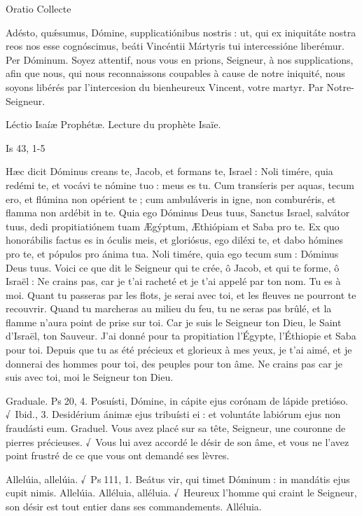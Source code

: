 \begin{paracol}{2}
Oratio
\switchcolumn
Collecte
\switchcolumn*

Adésto, quǽsumus, Dómine,  supplicatiónibus nostris : ut, qui ex iniquitáte nostra reos nos esse cognóscimus, beáti Vincéntii Mártyris tui intercessióne liberémur. Per Dóminum.
\switchcolumn
Soyez attentif, nous vous en prions,  Seigneur, à nos supplications, afin que nous, qui nous reconnaissons coupables à cause de notre iniquité, nous soyons libérés par l’intercesion du bienheureux Vincent, votre martyr. Par Notre-Seigneur.
\switchcolumn*

Léctio Isaíæ Prophétæ.
\switchcolumn
Lecture du prophète Isaïe.
\switchcolumn*

Is 43, 1-5
\switchcolumn

\switchcolumn*

Hæc dicit Dóminus creans te, Jacob,  et formans te, Israel : Noli timére, quia redémi te, et vocávi te nómine tuo : meus es tu. Cum transíeris per aquas, tecum ero, et flúmina non opérient te ; cum ambuláveris in igne, non comburéris, et flamma non ardébit in te. Quia ego Dóminus Deus tuus, Sanctus Israel, salvátor tuus, dedi propitiatiónem tuam Ægýptum, Æthiópiam et Saba pro te. Ex quo honorábilis factus es in óculis meis, et gloriósus, ego diléxi te, et dabo hómines pro te, et pópulos pro ánima tua. Noli timére, quia ego tecum sum : Dóminus Deus tuus.
\switchcolumn
Voici ce que dit le Seigneur qui te crée,  ô Jacob, et qui te forme, ô Israël : Ne crains pas, car je t’ai racheté et je t’ai appelé par ton nom. Tu es à moi. Quant tu passeras par les flots, je serai avec toi, et les fleuves ne pourront te recouvrir. Quand tu marcheras au milieu du feu, tu ne seras pas brûlé, et la flamme n’aura point de prise sur toi. Car je suis le Seigneur ton Dieu, le Saint d’Israël, ton Sauveur. J’ai donné pour ta propitiation l’Égypte, l’Éthiopie et Saba pour toi. Depuis que tu as été précieux et glorieux à mes yeux, je t’ai aimé, et je donnerai des hommes pour toi, des peuples pour ton âme. Ne crains pas car je suis avec toi, moi le Seigneur ton Dieu.
\switchcolumn*

Graduale. Ps 20, 4. Posuísti, Dómine, in cápite ejus corónam de lápide pretióso. √~Ibid., 3. Desidérium ánimæ ejus tribuísti ei : et voluntáte labiórum ejus non fraudásti eum.
\switchcolumn
Graduel. Vous avez placé sur sa tête, Seigneur, une couronne de pierres précieuses. √~Vous lui avez accordé le désir de son âme, et vous ne l’avez point frustré de ce que vous ont demandé ses lèvres.
\switchcolumn*

Allelúia, allelúia. √~Ps 111, 1. Beátus vir, qui timet Dóminum : in mandátis ejus cupit nimis. Allelúia.
\switchcolumn
Alléluia, alléluia. √~Heureux l’homme qui craint le Seigneur, son désir est tout entier dans ses commandements. Alléluia.
\switchcolumn*


\end{paracol}
